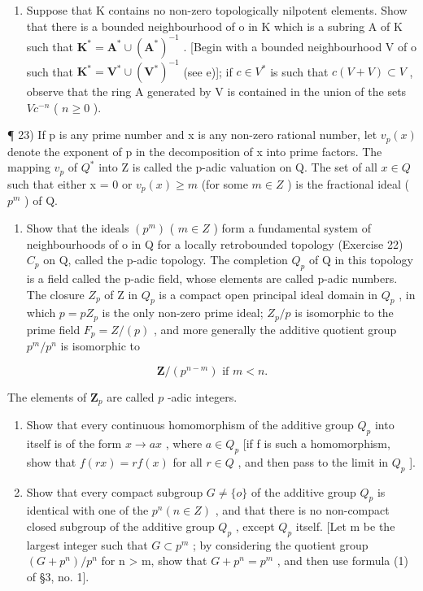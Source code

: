 \begin{enumerate}
\item
  Suppose that K contains no non-zero topologically nilpotent elements. Show that there is a bounded neighbourhood of o in K which is a subring A of K such that \(\mathbf{K}^{*} = \mathbf{A}^{*} \cup (\mathbf{A}^{*})^{-1}\) . {[}Begin with a bounded neighbourhood V of o such that \(\mathbf{K}^{*} = \mathbf{V}^{*} \cup (\mathbf{V}^{*})^{-1}\) (see e){]}; if \(c \in V^{*}\) is such that \(c(V + V) \subset V\) , observe that the ring A generated by V is contained in the union of the sets \(Vc^{-n}\) ( \(n \geqslant 0\) ).
\end{enumerate}

¶ 23) If p is any prime number and x is any non-zero rational number, let \(v_{p}(x)\) denote the exponent of p in the decomposition of x into prime factors. The mapping \(v_{p}\) of \(Q^{*}\) into Z is called the p-adic valuation on Q. The set of all \(x \in Q\) such that either x = 0 or \(v_{p}(x) \geqslant m\) (for some \(m \in Z\) ) is the fractional ideal ( \(p^{m}\) ) of Q.

\begin{enumerate}
\def\labelenumi{\alph{enumi})}
\tightlist
\item
  Show that the ideals \((p^{m})\) ( \(m \in Z\) ) form a fundamental system of neighbourhoods of o in Q for a locally retrobounded topology (Exercise 22) \(C_{p}\) on Q, called the p-adic topology. The completion \(Q_{p}\) of Q in this topology is a field called the p-adic field, whose elements are called p-adic numbers. The closure \(Z_{p}\) of Z in \(Q_{p}\) is a compact open principal ideal domain in \(Q_{p}\) , in which \(p = pZ_{p}\) is the only non-zero prime ideal; \(Z_{p}/p\) is isomorphic to the prime field \(F_{p} = Z/(p)\) , and more generally the additive quotient group \(p^{m}/p^{n}\) is isomorphic to
\end{enumerate}

\[
\mathbf {Z} / (p ^ {n - m}) \text {   if   } m <   n.
\]

The elements of \(\mathbf{Z}_p\) are called \(p\) -adic integers.

\begin{enumerate}
\def\labelenumi{\alph{enumi})}
\setcounter{enumi}{1}
\item
  Show that every continuous homomorphism of the additive group \(Q_{p}\) into itself is of the form \(x \to ax\) , where \(a \in Q_{p}\) {[}if f is such a homomorphism, show that \(f(rx) = rf(x)\) for all \(r \in Q\) , and then pass to the limit in \(Q_{p}\) {]}.
\item
  Show that every compact subgroup \(G \neq \{o\}\) of the additive group \(Q_{p}\) is identical with one of the \(p^{n} (n \in Z)\) , and that there is no non-compact closed subgroup of the additive group \(Q_{p}\) , except \(Q_{p}\) itself. {[}Let m be the largest integer such that \(G \subset p^{m}\) ; by considering the quotient group \((G + p^{n})/p^{n}\) for n \textgreater{} m, show that \(G + p^{n} = p^{m}\) , and then use formula (1) of §3, no. 1{]}.
\end{enumerate}

